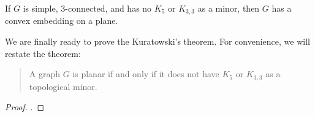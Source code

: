         \begin{lemma} \label{lem_convex_embed}
            If $G$ is simple, 3-connected, and has no $K_5$ or $K_{3,3}$ as a minor, then $G$ has a convex embedding on a plane.
        \end{lemma}
        
        We are finally ready to prove the Kuratowski's theorem. For convenience, we will restate the theorem:
        
        \begin{quote}
            A graph $G$ is planar if and only if it does not have $K_5$ or $K_{3,3}$ as a topological minor.
        \end{quote}
        
        \begin{proof}
            .
        \end{proof}
    

